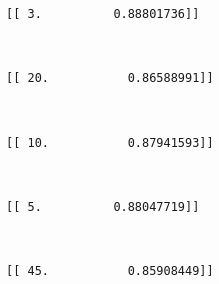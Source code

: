 \documentclass{article}
\begin{document}
    \begin{Verbatim}[commandchars=\\\{\}]
[[ 3.          0.88801736]]
    \end{Verbatim}

    \begin{center}
    \end{center}
    { \hspace*{\fill} \\}
    
    \begin{Verbatim}[commandchars=\\\{\}]
[[ 20.           0.86588991]]
    \end{Verbatim}

    \begin{center}
    \end{center}
    { \hspace*{\fill} \\}
    
    \begin{Verbatim}[commandchars=\\\{\}]
[[ 10.           0.87941593]]
    \end{Verbatim}

    \begin{center}
    \end{center}
    { \hspace*{\fill} \\}
    
    \begin{Verbatim}[commandchars=\\\{\}]
[[ 5.          0.88047719]]
    \end{Verbatim}

    \begin{center}
    \end{center}
    { \hspace*{\fill} \\}
    
    \begin{Verbatim}[commandchars=\\\{\}]
[[ 45.           0.85908449]]
    \end{Verbatim}
\end{document}
